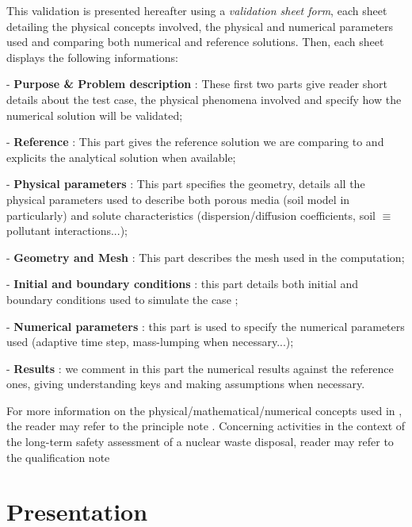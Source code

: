 This validation is presented hereafter using a \textit{validation sheet form},
each sheet detailing the physical concepts involved, the physical and numerical parameters used and comparing both numerical and reference solutions.
Then, each sheet displays the following informations:
\begin{list}{-}{}
\item [-] \textbf{Purpose \& Problem description} : These first two parts give reader short details about the test case, the physical phenomena involved and specify how the numerical solution will be validated;
\item [-] \textbf{Reference} : This part gives the reference solution we are comparing to and explicits the analytical solution when available;
\item [-] \textbf{Physical parameters} : This part specifies the geometry,
details all the physical parameters used to describe both porous media (soil model in particularly) and
solute characteristics (dispersion/diffusion coefficients, soil $\equiv$ pollutant interactions...);
\item [-] \textbf{Geometry and Mesh} : This part describes the mesh used in the \estel computation;
\item [-] \textbf{Initial and boundary conditions} : this part details both initial and boundary conditions used to simulate the case ;
\item [-] \textbf{Numerical parameters} : this part is used to specify the numerical parameters used
(adaptive time step, mass-lumping when necessary...);
\item [-] \textbf{Results} : we comment in this part the numerical results against the reference ones,
giving understanding keys and making assumptions when necessary.
\end{list}
%
\bigskip
%
For more information on the physical/mathematical/numerical concepts used in \estel,
the reader may refer to the \estel \rel principle note \cite{principlenote}.
Concerning \estel activities in the context of the long-term safety assessment of a nuclear waste disposal,
reader may refer to the \estel \rel qualification note \cite{qualificationnote}

\clearpage
\section{Presentation}
